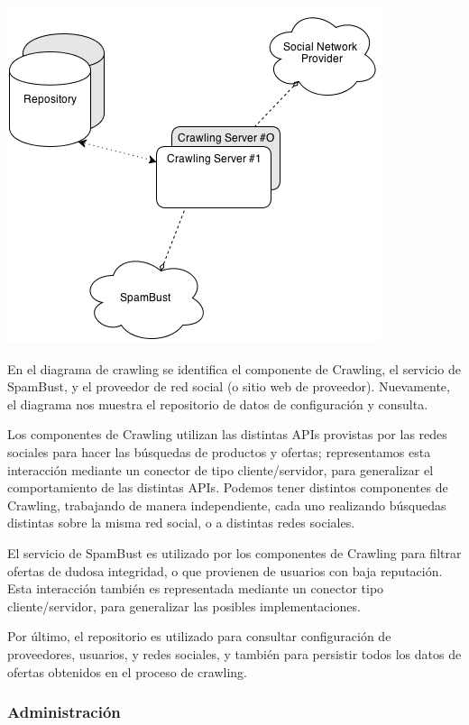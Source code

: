 \includegraphics[scale=0.5]{ISW2_cNc_Crawling}

En el diagrama de crawling se identifica el componente de Crawling, el servicio de SpamBust, y el proveedor de red social (o sitio web de proveedor). Nuevamente, el diagrama nos muestra el repositorio de datos de configuraci\'on y consulta.

Los componentes de Crawling utilizan las distintas APIs provistas por las redes sociales para hacer las b\'usquedas de productos y ofertas; representamos esta interacci\'on mediante un conector de tipo cliente/servidor, para generalizar el comportamiento de las distintas APIs. Podemos tener distintos componentes de Crawling, trabajando de manera independiente, cada uno realizando b\'usquedas distintas sobre la misma red social, o a distintas redes sociales.

El servicio de SpamBust es utilizado por los componentes de Crawling para filtrar ofertas de dudosa integridad, o que provienen de usuarios con baja reputaci\'on. Esta interacci\'on tambi\'en es representada mediante un conector tipo cliente/servidor, para generalizar las posibles implementaciones.

Por \'ultimo, el repositorio es utilizado para consultar configuraci\'on de proveedores, usuarios, y redes sociales, y tambi\'en para persistir todos los datos de ofertas obtenidos en el proceso de crawling.


\subsubsection*{Administraci\'on}

